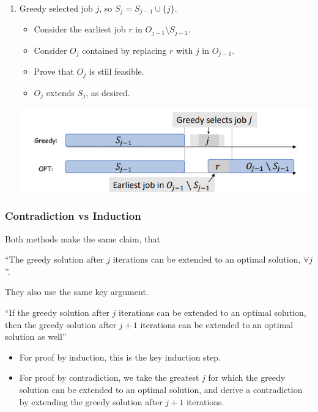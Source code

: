\begin{itemize}
\begin{enumerate}
        \item Greedy selected job $j$, so $S_j = S_{j-1} \cup \{j\}$.

        \begin{itemize}
            \item Consider the earliest job $r$ in $O_{j-1} \setminus S_{j-1}$.
            \item Consider $O_j$ contained by replacing $r$ with $j$ in $O_{j-1}$.
            \item Prove that $O_j$ is still feasible.
            \item $O_j$ extends $S_j$, as desired.
        \end{itemize}

        \begin{center}
            \includegraphics[width=0.67\linewidth]{figures/interval-scheduling-induction.png}
        \end{center}
    \end{enumerate}
\end{itemize}

\subsubsection{Contradiction vs Induction}

Both methods make the same claim, that \begin{center}
    ``The greedy solution after $j$ iterations can be extended to an optimal solution, $\forall j$''.
\end{center} They also use the same key argument. \begin{center} \begin{minipage}[t]{0.9\linewidth}
    ``If the greedy solution after $j$ iterations can be extended to an optimal solution, then the greedy solution after $j + 1$ iterations can be extended to an optimal solution as well''
\end{minipage}
\end{center}

\begin{itemize}
    \item For proof by induction, this is the key induction step.
    \item For proof by contradiction, we take the greatest $j$ for which the greedy solution can be extended to an optimal solution, and derive a contradiction by extending the greedy solution after $j + 1$ iterations.
\end{itemize}

